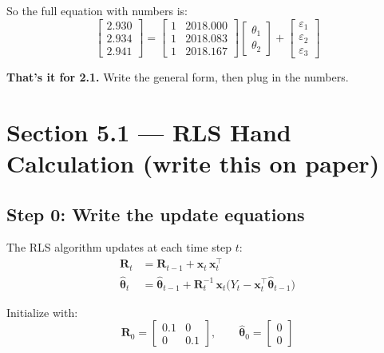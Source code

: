 \documentclass[11pt,a4paper]{article}
\begin{document}
So the full equation with numbers is:
\[
\begin{bmatrix} 2.930 \\ 2.934 \\ 2.941 \end{bmatrix}
=
\begin{bmatrix} 1 & 2018.000 \\ 1 & 2018.083 \\ 1 & 2018.167 \end{bmatrix}
\begin{bmatrix} \theta_1 \\ \theta_2 \end{bmatrix}
+
\begin{bmatrix} \varepsilon_1 \\ \varepsilon_2 \\ \varepsilon_3 \end{bmatrix}
\]

\textbf{That's it for 2.1.} Write the general form, then plug in the numbers.

\newpage

\section*{Section 5.1 --- RLS Hand Calculation (write this on paper)}

\subsection*{Step 0: Write the update equations}

The RLS algorithm updates at each time step $t$:
\begin{align}
\boldsymbol{R}_t &= \boldsymbol{R}_{t-1} + \boldsymbol{x}_t \, \boldsymbol{x}_t^\top \label{eq:Rupdate}\\[6pt]
\hat{\boldsymbol{\theta}}_t &= \hat{\boldsymbol{\theta}}_{t-1} + \boldsymbol{R}_t^{-1} \, \boldsymbol{x}_t \bigl( Y_t - \boldsymbol{x}_t^\top \hat{\boldsymbol{\theta}}_{t-1} \bigr) \label{eq:thetaupdate}
\end{align}

Initialize with:
\[
\boldsymbol{R}_0 = \begin{bmatrix} 0.1 & 0 \\ 0 & 0.1 \end{bmatrix}, \qquad
\hat{\boldsymbol{\theta}}_0 = \begin{bmatrix} 0 \\ 0 \end{bmatrix}
\]
\end{document}
